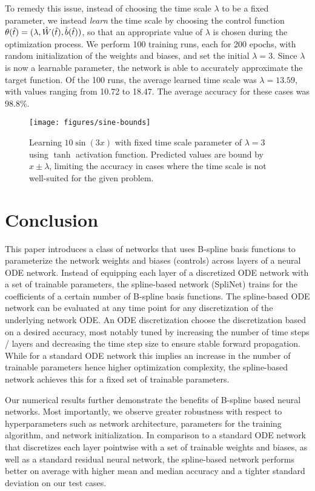 \documentclass[12pt]{amsart}
\begin{document}
To remedy this issue, instead of choosing the time scale $\lambda$ to be a fixed parameter, we instead \textit{learn} the time scale by choosing the control function $\theta(\hat{t}) = (\lambda, \hat{W}(\hat{t}), \hat{b}(\hat{t}))$, so that an appropriate value of $\lambda$ is chosen during the optimization process.
We perform 100 training runs, each for 200 epochs, with random initialization of the weights and biases, and set the initial $\lambda = 3$.
Since $\lambda$ is now a learnable parameter, the network is able to accurately approximate the target function.
Of the 100 runs, the average learned time scale was $\lambda = 13.59$, with values ranging from 10.72 to 18.47.
The average accuracy for these cases was 98.8\%.

\begin{figure}
  \centering
  \texttt{[image: figures/sine-bounds]}
  \caption{
    Learning $10\sin(3x)$ with fixed time scale parameter of $\lambda=3$ using $\tanh$ activation function.
    Predicted values are bound by $x \pm \lambda$, limiting the accuracy in cases where the time scale is not well-suited for the given problem.
    }
  \label{fig:sine-bounds}
\end{figure}

\section{Conclusion}

This paper introduces a class of networks that uses B-spline basis functions to parameterize the network weights and biases (controls) across layers of a neural ODE network.  Instead of equipping each layer of a discretized ODE network with a set of trainable parameters, the spline-based network (SpliNet) trains for the coefficients of a certain number of B-spline basis functions.
The spline-based ODE network can be evaluated at any time point for any discretization of the underlying network ODE.
An ODE discretization choose the discretization based on a desired
accuracy, most notably tuned by increasing the number of time steps / layers and decreasing the time step size to ensure stable forward propagation.
While for a standard ODE network this implies an increase in the number of trainable parameters hence higher optimization complexity, the spline-based network achieves this for a fixed set of trainable parameters.

Our numerical results further demonstrate the benefits of B-spline based neural networks. Most importantly, we observe greater robustness with respect to hyperparameters such as network architecture, parameters for the training algorithm, and network initialization.
In comparison to a standard ODE network that discretizes each layer pointwise with a set of trainable weights and biases, as well as a standard residual neural network, the spline-based network performs better on average with higher mean and median accuracy and a tighter standard deviation on our test cases.
\end{document}
